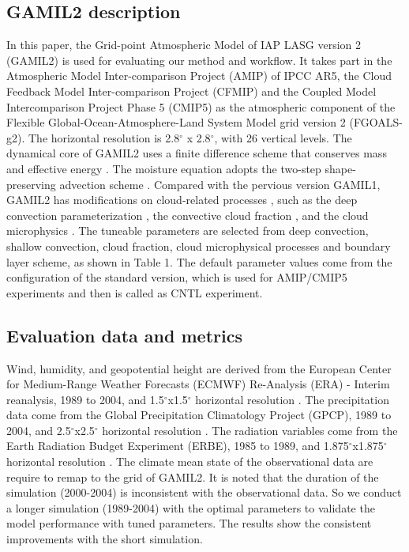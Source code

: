 \documentclass[gmd, manuscript]{copernicus}
\begin{document}
\subsection{GAMIL2 description}
In this paper, the Grid-point Atmospheric Model of IAP LASG version 2 (GAMIL2) is used for evaluating our method and workflow. It takes part in the Atmospheric Model Inter-comparison Project (AMIP) of IPCC AR5, the Cloud Feedback Model Inter-comparison Project (CFMIP) and the Coupled Model Intercomparison Project Phase 5 (CMIP5) as the atmospheric component of the Flexible Global-Ocean-Atmosphere-Land System Model grid version 2 (FGOALS-g2). The horizontal resolution is 2.8$^\circ$ x 2.8$^\circ$, with 26 vertical levels. The dynamical core of GAMIL2 uses a finite difference scheme that conserves mass and effective energy \citep{wang2004design}. The moisture equation adopts the two-step shape-preserving advection scheme \citep{rucong1994two}. Compared with the pervious version GAMIL1, GAMIL2 has modifications on cloud-related processes \citep{li2013evaluation}, such as the deep convection parameterization \citep{zhang2005effects}, the convective cloud fraction \citep{xu1991evaluation}, and the cloud microphysics \citep{morrison2008new}. The tuneable parameters are selected  from deep convection, shallow convection, cloud fraction, cloud microphysical processes and boundary layer scheme, as shown in Table 1. The default parameter values come from the configuration of the standard version, which is used for AMIP/CMIP5 experiments and then is called as CNTL experiment.



\subsection{Evaluation data and metrics}
Wind, humidity, and geopotential height are derived from the European Center for Medium-Range Weather Forecasts (ECMWF) Re-Analysis (ERA) - Interim reanalysis, 1989 to 2004, and 1.5$^\circ$x1.5$^\circ$ horizontal resolution \citep{simmons2007era}. The precipitation data come from the Global Precipitation Climatology Project (GPCP), 1989 to 2004, and 2.5$^\circ$x2.5$^\circ$ horizontal resolution \citep{adler2003version}. The radiation variables come from the Earth Radiation Budget Experiment (ERBE), 1985 to 1989,  and 1.875$^\circ$x1.875$^\circ$ horizontal resolution \citep{barkstrom1984earth}. The climate mean state of the observational data are require to  remap to the grid of GAMIL2. It is noted that the duration of the simulation (2000-2004)  is inconsistent with the observational data. So we conduct a longer simulation (1989-2004) with the optimal parameters to validate the model performance with tuned parameters. The results show the consistent improvements with the short simulation.
\end{document}
